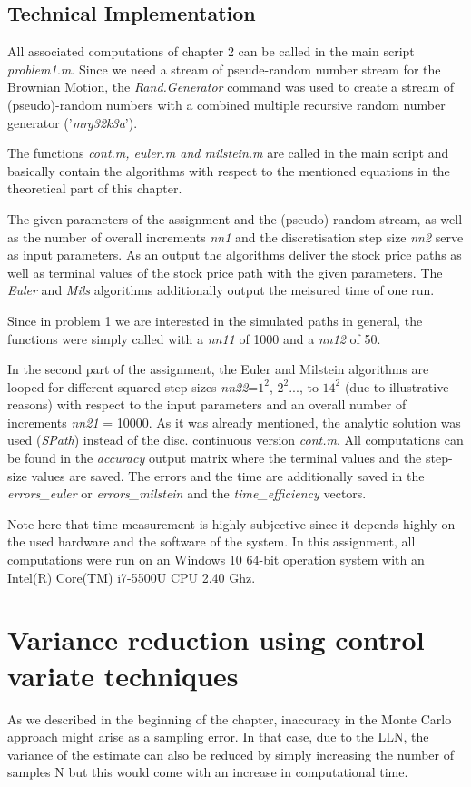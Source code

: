 \documentclass[a4paper,11pt]{article}
\begin{document}
\subsection{Technical Implementation}
All associated computations of chapter 2 can be called in the main script \textit{problem1.m}. Since we need a stream of pseude-random number stream for the Brownian Motion, the \textit{Rand.Generator} command was used to create a stream of (pseudo)-random numbers with a combined multiple recursive random number generator ('\textit{mrg32k3a}').

The functions \textit{cont.m, euler.m and milstein.m} are called in the main script and basically contain the algorithms with respect to the mentioned equations in the theoretical part of this chapter. 

The given parameters of the assignment and the (pseudo)-random stream, as well as the number of overall increments \textit{nn1} and the discretisation step size \textit{nn2} serve as input parameters. As an output the algorithms deliver the stock price paths as well as terminal values of the stock price path with the given parameters. The \textit{Euler} and \textit{Mils} algorithms additionally output the meisured time of one run.

Since in problem 1 we are interested in the simulated paths in general, the functions were simply called with a \textit{nn11} of 1000 and a \textit{nn12} of 50. 

In the second part of the assignment, the Euler and Milstein algorithms are looped for different squared step sizes \textit{nn22}=$1^2$, $2^2$..., to $14^2$ (due to illustrative reasons) with respect to the input parameters and an overall number of increments \textit{nn21} = 10000. As it was already mentioned,  the analytic solution was used (\textit{SPath}) instead of the disc. continuous version \textit{cont.m}.  All computations can be found in the \textit{accuracy} output matrix where the terminal values and the step-size values are saved. The errors and the time are additionally saved in the \textit{errors\_euler} or \textit{errors\_milstein} and the \textit{time\_efficiency} vectors.

Note here that time measurement is highly subjective since it depends highly on the used hardware and the software of the system. In this assignment, all computations were run on an Windows 10 64-bit operation system with an Intel(R) Core(TM) i7-5500U CPU 2.40 Ghz.

\section{Variance reduction using control variate techniques}
As we described in the beginning of the chapter, inaccuracy in the Monte Carlo approach might arise as a sampling error. In that case, due to the LLN, the variance of the estimate can also be reduced by simply increasing the number of samples N but this would come with an increase in computational time.
\end{document}
